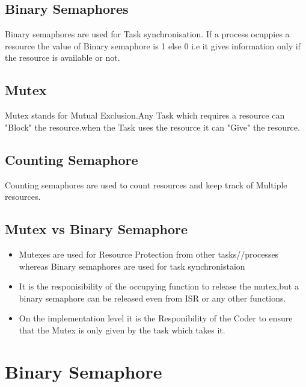 \documentclass[11pt,a4paper]{article}
\begin{document}
	\subsection{Binary Semaphores}
	
	Binary semaphores are used for Task synchronisation.
	If a process ocuppies a resource the value of Binary semaphore is 1 else 0 i.e it gives information only if the resource is available or not.
	
	\subsection{Mutex}
	
	Mutex stands for Mutual Exclusion.Any Task which requires a resource can "Block" the resource.when the Task uses the resource it can "Give" the resource.
	
	\subsection{Counting Semaphore}
	
	Counting semaphores are used to count resources and keep track of Multiple resources.
	\\
	 
	\subsection{Mutex vs Binary Semaphore}
	\begin{itemize}
		\item Mutexes are used for Resource Protection from other tasks//processes whereas Binary semaphores are used for task synchronistaion
		\\
		\item It is the responisibility of the occupying function to release the mutex,but a binary semaphore can be released even from ISR or any other functions.
		\\
		\item On the implementation level it is the Responibility of the Coder to ensure that the Mutex is only given by the task which takes it.
		
	\end{itemize}
		
	
	
	
	\newpage	
	\section{Binary Semaphore}
	
\end{document}
